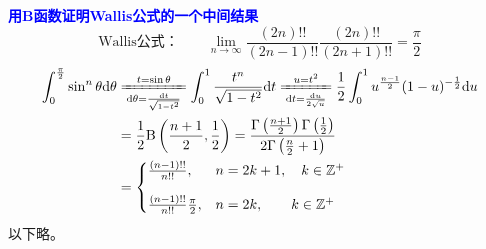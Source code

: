 \documentclass[UTF8,12pt]{ctexart}
\begin{document}
\begin{ebox}
    \textcolor{blue}{\bf 用B函数证明Wallis公式的一个中间结果}
    \begin{equation}
        \text{Wallis公式：}\qquad\lim_{n\rightarrow\infty}\frac{(2n)!!}{(2n-1)!!}\frac{(2n)!!}{(2n+1)!!}=\frac{\pi}{2}
    \end{equation}
    \begin{equation}
        \begin{aligned}
            \int_0^{\frac{\pi}{2}}\sin^n\theta{\rm d}\theta
            &\xlongequal[{\rm d}\theta=\frac{{\rm d}t}{\sqrt{1-t^2}}]{t=\sin\theta}\int_0^1\frac{t^n}{\sqrt{1-t^2}}{\rm d}t
            \xlongequal[{\rm d}t=\frac{{\rm d}u}{2\sqrt{u}}]{u=t^2}
            \frac{1}{2}\int_0^1 u^{\frac{n-1}{2}}(1-u)^{-\frac{1}{2}}{\rm d}u\\
            &=\frac{1}{2}{\rm B}\left(\frac{n+1}{2},\frac{1}{2}\right)
            =\frac{\Gamma\left(\frac{n+1}{2}\right)\Gamma\left(\frac{1}{2}\right)}{2\Gamma\left(\frac{n}{2}+1\right)}\\
            &=\begin{cases}
                \frac{(n-1)!!}{n!!},&n=2k+1,\quad k\in\mathbb{Z}^+\vspace{1em}\\
                \frac{(n-1)!!}{n!!}\frac{\pi}{2},&n=2k,\qquad k\in\mathbb{Z}^+\\
            \end{cases}
    \end{aligned}
    \end{equation}
以下略。
\end{ebox}
\end{document}
